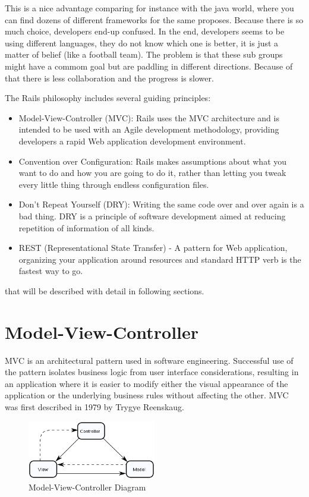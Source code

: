 This is a nice advantage comparing for instance with the java world, 
where you can find dozens of different frameworks for the same proposes.
Because there is so much choice, developers end-up confused.
In the end, developers seems to be using different languages,
they do not know which one is better, it is just a matter of belief (like a football team).
The problem is that these sub groups might have a commom goal but
are paddling in different directions.
Because of that there is less collaboration and the progress is slower.

The Rails philosophy includes several guiding principles:
\begin{itemize}
\item Model-View-Controller (MVC): Rails uses the MVC architecture and 
      is intended to be used with an Agile development methodology,
      providing developers a rapid Web application development environment.
\item Convention over Configuration: Rails makes assumptions about 
      what you want to do and how you are going to do it, 
      rather than letting you tweak every little thing through endless configuration files.
\item Don’t Repeat Yourself (DRY): Writing the same code over and over again is a bad thing. 
      DRY is a principle of software development aimed at reducing repetition of information of all kinds.
\item REST (Representational State Transfer) - A pattern for Web application, 
      organizing your application around resources and standard HTTP verb is the fastest way to go.
\end{itemize}
that will be described with detail in following sections.


\section{Model-View-Controller} 
MVC is an architectural pattern used in software engineering. 
Successful use of the pattern isolates business logic from user interface considerations, 
resulting in an application where it is easier to modify either the visual appearance of the application 
or the underlying business rules without affecting the other.
MVC was first described in 1979 by Trygye Reenskaug.

\begin{figure}[h!]
  \caption{Model-View-Controller Diagram}
  \centering
  \includegraphics[width=0.5\textwidth]{Images/ModelViewController}
\end{figure}

